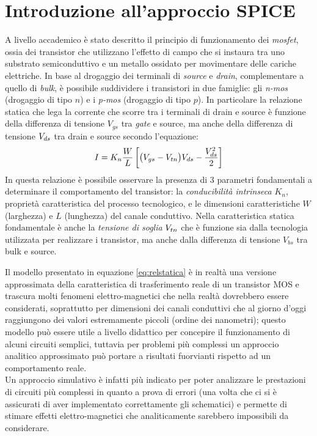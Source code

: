 \chapter{Introduzione all'approccio SPICE}
	
	A livello accademico è stato descritto il principio di funzionamento dei \textit{mosfet}, ossia dei transistor che utilizzano l'effetto di campo che si instaura tra uno substrato semiconduttivo e un metallo ossidato per movimentare delle cariche elettriche. In base al drogaggio dei terminali di \textit{source} e \textit{drain}, complementare a quello di \textit{bulk}, è possibile suddividere i transistori in due famiglie: gli \textit{n-mos} (drogaggio di tipo $n$) e i \textit{p-mos} (drogaggio di tipo $p$). In particolare la relazione statica che lega la corrente che scorre tra i terminali di drain e source è funzione della differenza di tensione $V_{gs}$ tra \textit{gate} e source, ma anche della differenza di tensione $V_{ds}$ tra drain e source secondo l'equazione:
	\begin{equation} \label{eq:relstatica}
		I = K_n \frac W L \left[ \big(V_{gs} - V_{tn}\big)V_{ds} - \frac{V_{ds}^2}{2} \right]
	\end{equation} 
	In questa relazione è possibile osservare la presenza di 3 parametri fondamentali a determinare il comportamento del transistor: la \textit{conducibilità intrinseca} $K_n$, proprietà caratteristica del processo tecnologico, e le dimensioni caratteristiche $W$ (larghezza) e $L$ (lunghezza) del canale conduttivo. Nella caratteristica statica fondamentale è anche la \textit{tensione di soglia} $V_{tn}$ che è funzione sia dalla tecnologia utilizzata per realizzare i transistor, ma anche dalla differenza di tensione $V_{bs}$ tra bulk e source. 
	
	Il modello presentato in equazione \ref{eq:relstatica} è in realtà una versione approssimata della caratteristica di trasferimento reale di un transistor MOS e trascura molti fenomeni elettro-magnetici che nella realtà dovrebbero essere considerati, soprattutto per dimensioni dei canali conduttivi che al giorno d'oggi raggiungono dei valori estremamente piccoli (ordine dei nanometri); questo modello può essere utile a livello didattico per concepire il funzionamento di alcuni circuiti semplici, tuttavia per problemi più complessi un approccio analitico approssimato può portare a risultati fuorvianti rispetto ad un comportamento reale. \\
	Un approccio simulativo è infatti più indicato per poter analizzare le prestazioni di circuiti più complessi in quanto a prova di errori (una volta che ci si è assicurati di aver implementato correttamente gli schematici) e permette di stimare effetti elettro-magnetici che analiticamente sarebbero impossibili da considerare.
	
